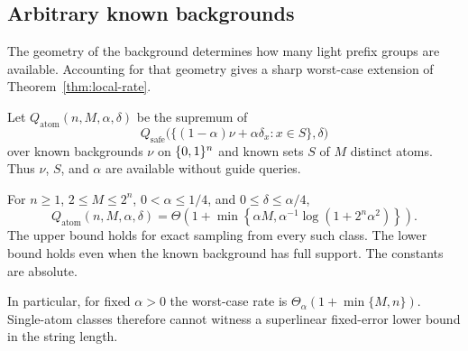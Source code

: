 \subsection{Arbitrary known backgrounds}\label{sec:background}
The geometry of the background determines how many light prefix groups are available. Accounting for that geometry gives a sharp worst-case extension of Theorem~\ref{thm:local-rate}.

Let $Q_{\mathrm{atom}}(n,M,\alpha,\delta)$ be the supremum of
\[
 Q_{\mathrm{safe}}\bigl(\{(1-\alpha)\nu+\alpha\delta_x:x\in S\},\delta\bigr)
\]
over known backgrounds $\nu$ on $\{0,1\}^n$ and known sets $S$ of $M$ distinct atoms. Thus $\nu$, $S$, and $\alpha$ are available without guide queries.

\begin{theorem}\label{thm:background}
For $n\ge1$, $2\le M\le2^n$, $0<\alpha\le1/4$, and $0\le\delta\le\alpha/4$,
\begin{equation}\label{eq:background-rate}
 Q_{\mathrm{atom}}(n,M,\alpha,\delta)
 =\Theta\!\left(1+\min\left\{\alpha M,
             \alpha^{-1}\log(1+2^n\alpha^2)\right\}\right).
\end{equation}
The upper bound holds for exact sampling from every such class. The lower bound holds even when the known background has full support. The constants are absolute.
\end{theorem}
In particular, for fixed $\alpha>0$ the worst-case rate is $\Theta_\alpha(1+\min\{M,n\})$. Single-atom classes therefore cannot witness a superlinear fixed-error lower bound in the string length.

